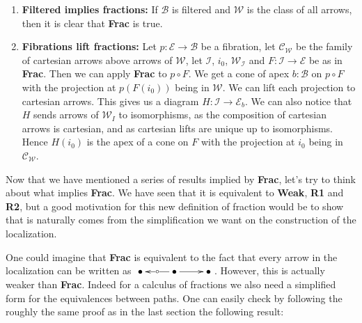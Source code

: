 \documentclass{article}
\numberwithin{equation}{section}
\theoremstyle{definition}
\theoremstyle{plain}
\begin{document}
\begin{enumerate}
	\item \textbf{Filtered implies fractions:} If $\mathcal{B}$ is filtered and $\mathcal{W}$ is the class of all arrows, then it is clear that \textbf{Frac} is true.
	\item \textbf{Fibrations lift fractions:} Let $p: \mathcal{E} \to \mathcal{B}$ be a fibration, let $\mathcal{C}_{\mathcal{W}}$ be the family of cartesian arrows above arrows of $\mathcal{W}$, let $\mathcal{I}$, $i_0$, $\mathcal{W}_{\mathcal{I}}$ and $F:\mathcal{I} \to \mathcal{E}$ be as in \textbf{Frac}. Then we can apply \textbf{Frac} to $p\circ F$. We get a cone of apex $b:\mathcal{B}$ on $p\circ F$ with the projection at $p(F(i_0))$ being in $\mathcal{W}$. We can lift each projection to cartesian arrows. This gives us a diagram $H: \mathcal{I} \to \mathcal{E}_b$. We can also notice that $H$ sends arrows of $\mathcal{W}_I$ to isomorphisms, as the composition of cartesian arrows is cartesian, and as cartesian lifts are unique up to isomorphisms. Hence $H(i_0)$ is the apex of a cone on $F$ with the projection at $i_0$ being in $\mathcal{C}_{\mathcal{W}}$.
\end{enumerate}

Now that we have mentioned a series of results implied by \textbf{Frac}, let's try to think about what implies \textbf{Frac}. We have seen that it is equivalent to \textbf{Weak}, \textbf{R1} and \textbf{R2}, but a good motivation for this new definition of fraction would be to show that is naturally comes from the simplification we want on the construction of the localization.

One could imagine that \textbf{Frac} is equivalent to the fact that every arrow in the localization can be written as $\xymatrix{\bullet & \bullet \ar[l]|{\circ} \ar[r] & \bullet}$. However, this is actually weaker than \textbf{Frac}. Indeed for a calculus of fractions we also need a simplified form for the equivalences between paths. One can easily check by following the roughly the same proof as in the last section the following result:
\end{document}
